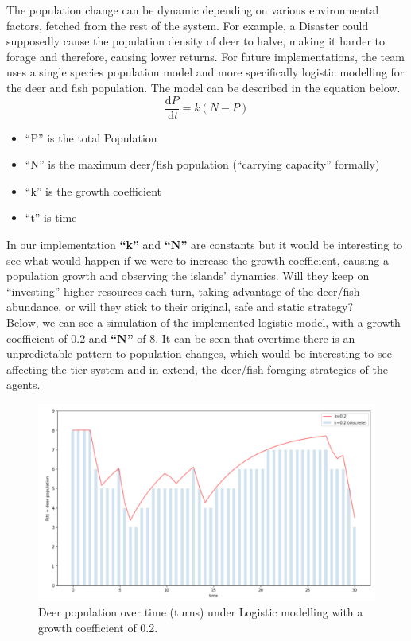 The population change can be dynamic depending on various environmental factors, fetched from the rest of the system. For example, a Disaster could supposedly cause the population density of deer to halve, making it harder to forage and therefore, causing lower returns. For future implementations, the team uses a single species population model and more specifically logistic modelling for the deer and fish population. The model can be described in the equation below.\\

\begin{equation}
\frac{\mathrm{d} P}{\mathrm{~d} t}=k(N-P)
\end{equation}

\begin{itemize}
        \item “P” is the total Population \item “N” is the maximum deer/fish population (“carrying capacity” formally)
        \item “k” is the growth coefficient
        \item “t” is time
    \end{itemize}

In our implementation \textbf{“k”} and \textbf{“N”} are constants but it would be interesting to see what would happen if we were to increase the growth coefficient, causing a population growth and observing the islands’ dynamics. Will they keep on “investing” higher resources each turn, taking advantage of the deer/fish abundance, or will they stick to their original, safe and static strategy?\\

Below, we can see a simulation of the implemented logistic model, with a growth coefficient of 0.2 and \textbf{“N”} of 8. It can be seen that overtime there is an unpredictable pattern to population changes, which would be interesting to see affecting the tier system and in extend, the deer/fish foraging strategies of the agents.\\

\begin{figure}[!htb]
    \centering
    \includegraphics[width=1\textwidth]{04_environment/Images/Deer population over time.PNG}
    \caption{Deer population over time (turns) under Logistic modelling with a growth coefficient of 0.2.}
    \label{Images:Deer population over time}
\end{figure}

